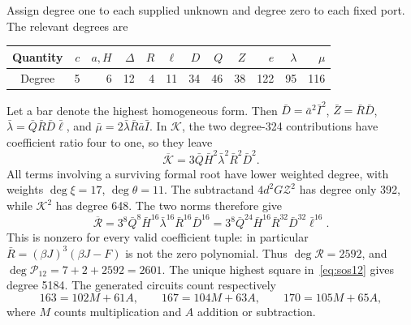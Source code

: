 Assign degree one to each supplied unknown and degree zero to each
fixed port.  The relevant degrees are
\begin{center}\small
\begin{tabular}{c|rrrrrrrrrrr}
Quantity &$c$&$a,H$&$\Delta$&$R$&$\ell$&$D$&$Q$&$Z$&$e$&$\lambda$&$\mu$\\
\hline
Degree &5&6&12&4&11&34&46&38&122&95&116
\end{tabular}
\end{center}
Let a bar denote the highest homogeneous form.  Then
$\bar D=\bar a^2\bar I^2$, $\bar Z=\bar R\bar D$,
$\bar\lambda=\bar Q\bar R\bar D\bar\ell$, and
$\bar\mu=2\bar\lambda\bar R\bar a\bar I$.
In $\mathcal K$, the two degree-324 contributions have coefficient
ratio four to one, so they leave
\[
\overline{\mathcal K}
=3\bar Q\bar H^2\bar\lambda^2\bar R^2\bar D^2.
\]
All terms involving a surviving formal root have lower weighted
degree, with weights $\deg\xi=17$, $\deg\theta=11$.
The subtractand $4d^2G\mathcal Z^2$ has degree only 392, while
$\mathcal K^2$ has degree 648.  The two norms therefore give
\[
\overline{\mathcal R}
=3^8\bar Q^8\bar H^{16}\bar\lambda^{16}\bar R^{16}\bar D^{16}
=3^8\bar Q^{24}\bar H^{16}\bar R^{32}\bar D^{32}\bar\ell^{16}.
\]
This is nonzero for every valid coefficient tuple: in particular
$\bar R=(\beta J)^3(\beta J-F)$ is not the zero polynomial.
Thus $\deg\mathcal R=2592$, and
$\deg\mathcal P_{12}=7+2+2592=2601$.
The unique highest square in~\eqref{eq:sos12} gives degree 5184.
The generated circuits count respectively
\[
163=102M+61A,\qquad167=104M+63A,\qquad170=105M+65A,
\]
where $M$ counts multiplication and $A$ addition or subtraction.
